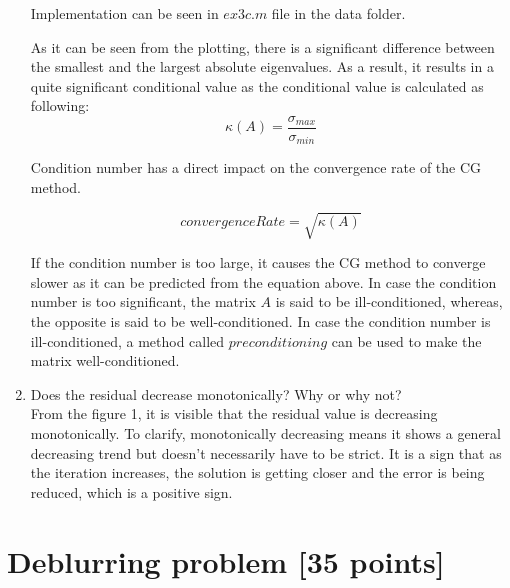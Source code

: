 \documentclass[unicode,11pt,a4paper,oneside,numbers=endperiod,openany]{scrartcl}
\begin{document}
\begin{enumerate}
Implementation can be seen in ${ex3c.m}$ file in the data folder.

As it can be seen from the plotting, there is a significant difference between the smallest and the largest absolute eigenvalues. As a result, it results in a quite significant conditional value as the conditional value is calculated as following: \\

\begin{equation}
 \kappa{(A)} = \frac{\sigma_{max}}{\sigma_{min}}
\end{equation}

Condition number has a direct impact on the convergence rate of the CG method.

\begin{equation}
 convergenceRate = \sqrt{\kappa{(A)}}
\end{equation}

If the condition number is too large, it causes the CG method to converge slower as it can be predicted from the equation above. In case the condition number is too significant, the matrix ${A}$ is said to be ill-conditioned, whereas, the opposite is said to be well-conditioned. In case the condition number is ill-conditioned, a method called ${preconditioning}$ can be used to make the matrix well-conditioned. \\

\item Does the residual decrease monotonically? Why or why not? \\

From the figure 1, it is visible that the residual value is decreasing monotonically. To clarify, monotonically decreasing means it shows a general decreasing trend but doesn't necessarily have to be strict. It is a sign that as the iteration increases, the solution is getting closer and the error is being reduced, which is a positive sign.

\end{enumerate}


\section{Deblurring problem [35 points]}
\end{document}
